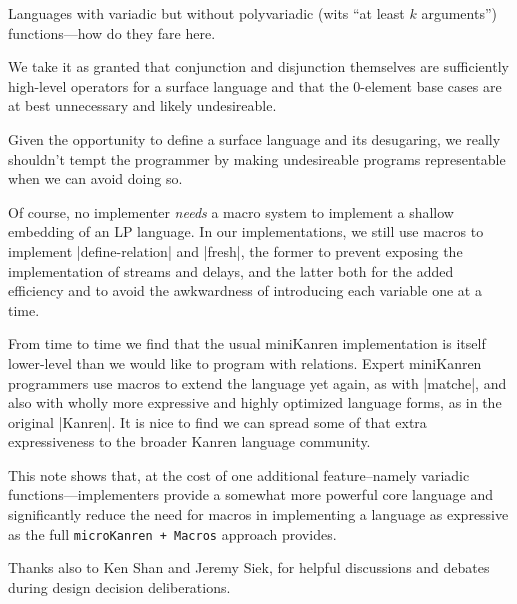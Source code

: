 \documentclass[sigplan,screen,draft,anonymous,review,natbib=false]{acmart}
\begin{document}
Languages with variadic but without polyvariadic (wits \enquote{at
  least $k$ arguments}) functions---how do they fare here.

We take it as granted that conjunction and disjunction themselves are
sufficiently high-level operators for a surface language and that the
0-element base cases are at best unnecessary and likely undesireable.

Given the opportunity to define a surface language and its desugaring,
we really shouldn't tempt the programmer by making undesireable
programs representable when we can avoid doing so.

Of course, no implementer \emph{needs} a macro system to implement a
shallow embedding of an LP language. In our implementations, we still
use macros to implement \rackinline|define-relation| and
\rackinline|fresh|, the former to prevent exposing the implementation
of streams and delays, and the latter both for the added efficiency
and to avoid the awkwardness of introducing each variable one at a
time.

From time to time we find that the usual miniKanren implementation is
itself lower-level than we would like to program with relations.
Expert miniKanren programmers use macros to extend the language yet
again, as with \rackinline|matche|, and also with wholly more
expressive and highly optimized language forms, as in the original
\rackinline|Kanren|. It is nice to find we can spread some of that
extra expressiveness to the broader Kanren language community.

This note shows that, at the cost of one additional feature--namely
variadic functions---implementers provide a somewhat more powerful
core language and significantly reduce the need for macros in
implementing a language as expressive as the full
\verb|microKanren + Macros| approach provides.

\begin{acks}

Thanks also to Ken Shan and Jeremy Siek, for helpful discussions and
debates during design decision deliberations.

\end{acks}

\printbibliography{}
\end{document}
